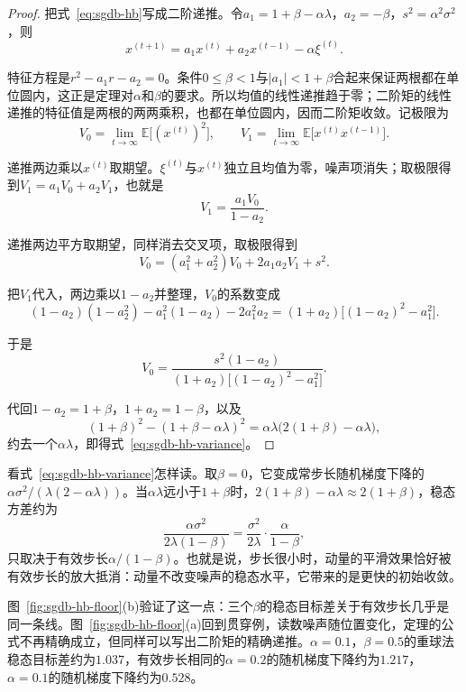 \begin{proof}
把式~\eqref{eq:sgdb-hb}写成二阶递推。令$a_1=1+\beta-\alpha\lambda$，$a_2=-\beta$，$s^2=\alpha^2\sigma^2$，则
\[
 x^{(t+1)}=a_1x^{(t)}+a_2x^{(t-1)}-\alpha\xi^{(t)}.
\]

特征方程是$r^2-a_1r-a_2=0$。条件$0\leq\beta<1$与$\lvert a_1\rvert<1+\beta$合起来保证两根都在单位圆内，这正是定理对$\alpha$和$\beta$的要求。所以均值的线性递推趋于零；二阶矩的线性递推的特征值是两根的两两乘积，也都在单位圆内，因而二阶矩收敛。记极限为
\[
 V_0=\lim_{t\to\infty}\mathbb{E}\bigl[(x^{(t)})^2\bigr],\qquad
 V_1=\lim_{t\to\infty}\mathbb{E}\bigl[x^{(t)}x^{(t-1)}\bigr].
\]

递推两边乘以$x^{(t)}$取期望。$\xi^{(t)}$与$x^{(t)}$独立且均值为零，噪声项消失；取极限得到$V_1=a_1V_0+a_2V_1$，也就是
\[
 V_1=\frac{a_1V_0}{1-a_2}.
\]

递推两边平方取期望，同样消去交叉项，取极限得到
\[
 V_0=(a_1^2+a_2^2)V_0+2a_1a_2V_1+s^2 .
\]

把$V_1$代入，两边乘以$1-a_2$并整理，$V_0$的系数变成
\[
 (1-a_2)(1-a_2^2)-a_1^2(1-a_2)-2a_1^2a_2
 =(1+a_2)\bigl[(1-a_2)^2-a_1^2\bigr].
\]

于是
\[
 V_0=\frac{s^2(1-a_2)}{(1+a_2)\bigl[(1-a_2)^2-a_1^2\bigr]}.
\]

代回$1-a_2=1+\beta$，$1+a_2=1-\beta$，以及
\[
 (1+\beta)^2-(1+\beta-\alpha\lambda)^2=\alpha\lambda\bigl(2(1+\beta)-\alpha\lambda\bigr),
\]
约去一个$\alpha\lambda$，即得式~\eqref{eq:sgdb-hb-variance}。
\end{proof}

看式~\eqref{eq:sgdb-hb-variance}怎样读。取$\beta=0$，它变成常步长随机梯度下降的$\alpha\sigma^2/(\lambda(2-\alpha\lambda))$。当$\alpha\lambda$远小于$1+\beta$时，$2(1+\beta)-\alpha\lambda\approx2(1+\beta)$，稳态方差约为
\begin{equation}
 \frac{\alpha\sigma^2}{2\lambda(1-\beta)}=\frac{\sigma^2}{2\lambda}\cdot\frac{\alpha}{1-\beta},
 \label{eq:sgdb-hb-small-step}
\end{equation}
只取决于有效步长$\alpha/(1-\beta)$。也就是说，步长很小时，动量的平滑效果恰好被有效步长的放大抵消：动量不改变噪声的稳态水平，它带来的是更快的初始收敛。

图~\ref{fig:sgdb-hb-floor}(b)验证了这一点：三个$\beta$的稳态目标差关于有效步长几乎是同一条线。图~\ref{fig:sgdb-hb-floor}(a)回到贯穿例，读数噪声随位置变化，定理的公式不再精确成立，但同样可以写出二阶矩的精确递推。$\alpha=0.1$，$\beta=0.5$的重球法稳态目标差约为$1.037$，有效步长相同的$\alpha=0.2$的随机梯度下降约为$1.217$，$\alpha=0.1$的随机梯度下降约为$0.528$。

